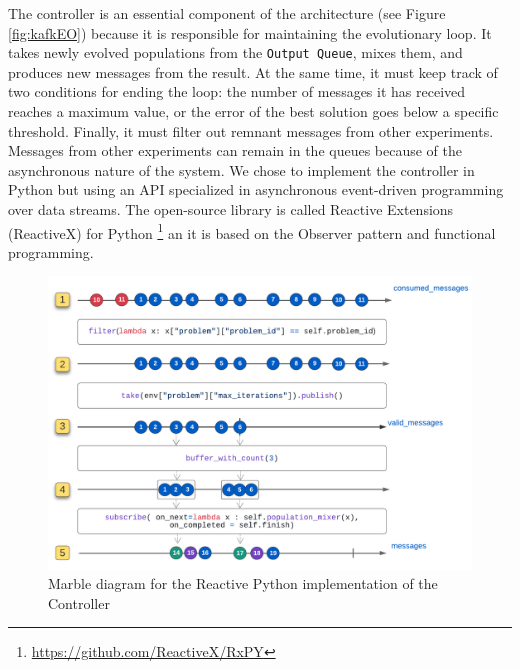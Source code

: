\documentclass[review]{elsarticle}
\begin{document}
The controller is an essential component of the architecture (see Figure \ref{fig:kafkEO})
because it is responsible for maintaining the evolutionary loop. It takes newly
evolved populations from the \texttt{Output Queue}, mixes them,   and produces new
messages from the result. At the same time, it must keep track of two conditions
for ending the loop: the number of messages it has received reaches a maximum
value, or the error of the best solution goes below a specific threshold.  Finally, it
must filter out remnant messages from other experiments. Messages from other
experiments can remain in the queues because of the asynchronous nature of the
system.  We chose to implement the controller in Python but using an API
specialized in asynchronous event-driven programming over data streams.  
The open-source library is called Reactive Extensions (ReactiveX) for Python 
\footnote{\url{https://github.com/ReactiveX/RxPY}} an it is based on the Observer 
pattern \cite{gamma1995design} and functional programming.

\begin{figure}[ht]
    \centering
    \includegraphics[width=\textwidth]{marble_controller}
    \caption{Marble diagram for the Reactive Python implementation of the Controller}
    \label{fig:marble_controller}
\end{figure}
\end{document}
